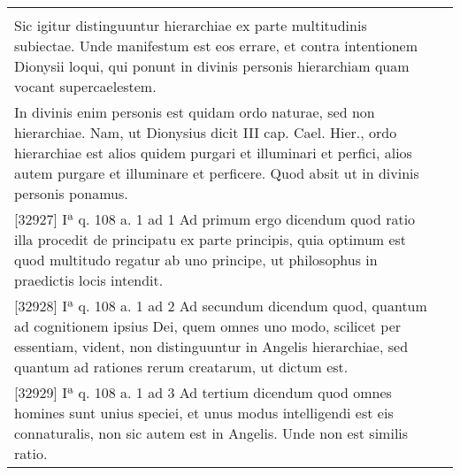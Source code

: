\documentclass[10pt]{jsarticle} %
\begin{document}
\begin{longtable}{p{21em}p{21em}}
&


\\


Sic igitur
distinguuntur hierarchiae ex parte multitudinis subiectae. Unde
manifestum est eos errare, et contra intentionem Dionysii loqui, qui
ponunt in divinis personis hierarchiam quam vocant supercaelestem. 



&


\\


In
divinis enim personis est quidam ordo naturae, sed non
hierarchiae. Nam, ut Dionysius dicit III cap. Cael. Hier., ordo
hierarchiae est alios quidem purgari et illuminari et perfici, alios
autem purgare et illuminare et perficere. Quod absit ut in divinis
personis ponamus.

&


\\


[32927] Iª q. 108 a. 1 ad 1
Ad primum ergo dicendum quod ratio illa procedit de principatu ex
parte principis, quia optimum est quod multitudo regatur ab uno
principe, ut philosophus in praedictis locis intendit.

&


\\


[32928] Iª q. 108 a. 1 ad 2
Ad secundum dicendum quod, quantum ad cognitionem ipsius Dei, quem
omnes uno modo, scilicet per essentiam, vident, non distinguuntur in
Angelis hierarchiae, sed quantum ad rationes rerum creatarum, ut
dictum est.

&


\\


[32929] Iª q. 108 a. 1 ad 3
Ad tertium dicendum quod omnes homines sunt unius speciei, et unus
modus intelligendi est eis connaturalis, non sic autem est in
Angelis. Unde non est similis ratio.

&




\end{longtable}
\newpage
\end{document}

